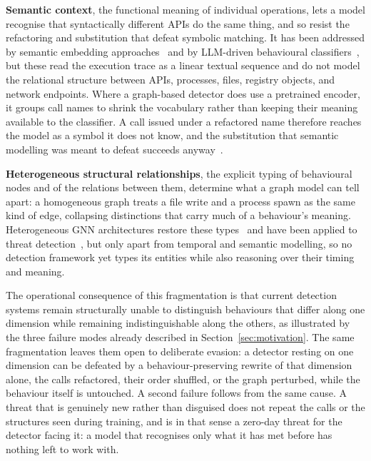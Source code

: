 \documentclass[%
    BCOR=10mm,
    DIV=13,
    toc=bibliography,
    toc=listof,
    oneside,
    12pt,
]{scrbook}
\begin{document}
\textbf{Semantic context}, the functional meaning of individual operations, lets a
model recognise that syntactically different APIs do the same thing, and so resist
the refactoring and substitution that defeat symbolic matching. It has been
addressed by semantic embedding approaches~\cite{reimers2019sbert,
lee2024gecko, mpnet2020} and by LLM-driven behavioural
classifiers~\cite{perera2023beacon}, but these read the execution trace as a
linear textual sequence and do not model the relational structure between APIs,
processes, files, registry objects, and network endpoints. Where a graph-based
detector does use a pretrained encoder, it groups call names to shrink the
vocabulary rather than keeping their meaning available to the classifier. A
call issued under a refactored name therefore reaches the model as a symbol it
does not know, and the substitution that semantic modelling was meant to defeat
succeeds anyway~\cite{amer2025graphshield}.

\textbf{Heterogeneous structural relationships}, the explicit typing of behavioural
nodes and of the relations between them, determine what a graph model can tell apart:
a homogeneous graph treats a file write and a process spawn as the same kind of edge,
collapsing distinctions that carry much of a behaviour's meaning. Heterogeneous GNN
architectures restore these types~\cite{han2019, hetgnn2019} and have been applied to
threat detection~\cite{wang2019matchgnet, li2024imbalanced}, but only apart from
temporal and semantic modelling, so no detection framework yet types its entities
while also reasoning over their timing and meaning.

The operational consequence of this fragmentation is that current detection
systems remain structurally unable to distinguish behaviours that differ along
one dimension while remaining indistinguishable along the others, as
illustrated by the three failure modes already described in
Section~\ref{sec:motivation}. The same fragmentation leaves them open to
deliberate evasion: a detector resting on one dimension can be defeated by a
behaviour-preserving rewrite of that dimension alone, the calls refactored,
their order shuffled, or the graph perturbed, while the behaviour itself is
untouched. A second failure follows from the same cause. A threat that is
genuinely new rather than disguised does not repeat the calls or the structures
seen during training, and is in that sense a zero-day threat for the detector
facing it: a model that recognises only what it has met before has nothing left
to work with.
\end{document}

